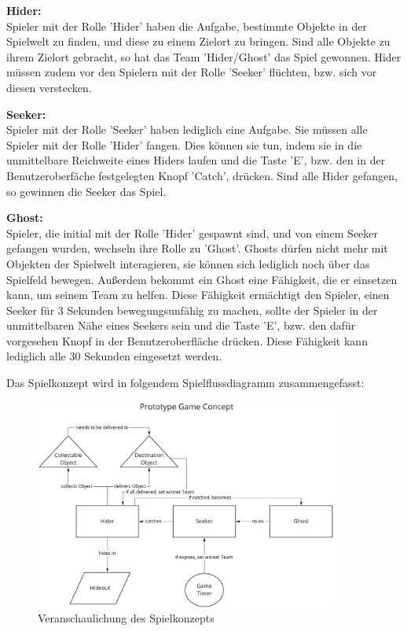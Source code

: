 \textbf{Hider:} \\
Spieler mit der Rolle 'Hider' haben die Aufgabe, bestimmte Objekte in der Spielwelt zu finden, und diese zu einem Zielort zu bringen. Sind alle Objekte zu ihrem Zielort gebracht, so hat das Team 'Hider/Ghost' das Spiel gewonnen. Hider müssen zudem vor den Spielern mit der Rolle 'Seeker' flüchten, bzw. sich vor diesen verstecken. 

\textbf{Seeker:} \\
Spieler mit der Rolle 'Seeker' haben lediglich eine Aufgabe. Sie müssen alle Spieler mit der Rolle 'Hider' fangen. Dies können sie tun, indem sie in die unmittelbare Reichweite eines Hiders laufen und die Taste 'E', bzw. den in der Benutzeroberfäche festgelegten Knopf 'Catch', drücken. Sind alle Hider gefangen, so gewinnen die Seeker das Spiel.

\textbf{Ghost:} \\
Spieler, die initial mit der Rolle 'Hider' gespawnt sind, und von einem Seeker gefangen wurden, wechseln ihre Rolle zu 'Ghost'. Ghosts dürfen nicht mehr mit Objekten der Spielwelt interagieren, sie können sich lediglich noch über das Spielfeld bewegen. Außerdem bekommt ein Ghost eine Fähigkeit, die er einsetzen kann, um seinem Team zu helfen. Diese Fähigkeit ermächtigt den Spieler, einen Seeker für 3 Sekunden bewegungsunfähig zu machen, sollte der Spieler in der unmittelbaren Nähe eines Seekers sein und die Taste 'E', bzw. den dafür vorgesehen Knopf in der Benutzeroberfläche drücken. Diese Fähigkeit kann lediglich alle 30 Sekunden eingesetzt werden.

Das Spielkonzept wird in folgendem Spielflussdiagramm zusammengefasst:

\begin{figure}[H]
	\centering
	\includegraphics[width=100mm]{images/game_concept.jpg}
	\caption[Spielkonzept Diagramm]{Veranschaulichung des Spielkonzepts}
	\label{pic:game_concept}
\end{figure}


